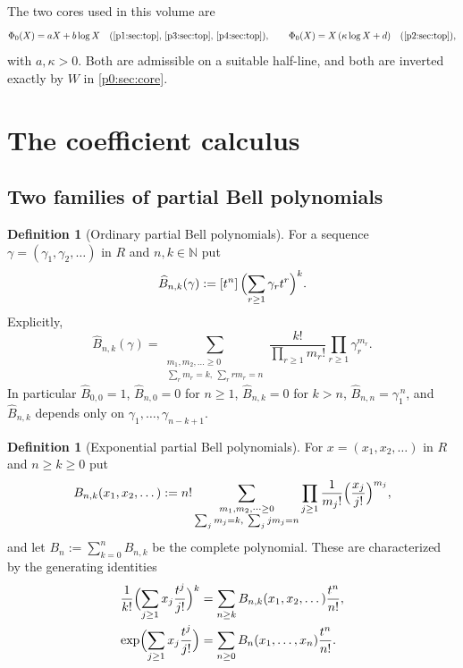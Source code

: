 \documentclass[11pt,a4paper,oneside]{book}
\theoremstyle{plain}
\theoremstyle{definition}
\newtheorem{definition}[theorem]{Definition}
\theoremstyle{remark}
\newcommand{\Nat}{\mathbb{N}}
\newcommand{\Coef}[1]{[#1]\,}
\newcommand{\OB}{\widehat{B}}
\newcommand{\EB}{B}
\newcommand{\Wlam}{W}
\begin{document}
The two cores used in this volume are
\begin{equation}\label{p0:eq:two-cores}
 \Phi_0(X)=aX+b\log X
 \quad(\text{\cref{p1:sec:top},\ \ref{p3:sec:top},\ \ref{p4:sec:top}}),
 \qquad
 \Phi_0(X)=X\,(\kappa\log X+d)
 \quad(\text{\cref{p2:sec:top}}),
\end{equation}
with $a,\kappa>0$.  Both are admissible on a suitable half-line, and both are
inverted exactly by $\Wlam$ in \cref{p0:sec:core}.

\section{The coefficient calculus}\label{p0:sec:calculus}

\subsection{Two families of partial Bell polynomials}

\begin{definition}[Ordinary partial Bell polynomials]\label{p0:def:obell}
For a sequence $\gamma=(\gamma_1,\gamma_2,\dots)$ in $R$ and $n,k\in\Nat$ put
\begin{equation}\label{p0:eq:obell-def}
 \OB_{n,k}(\gamma):=\Coef{t^n}\Bigl(\sum_{r\ge1}\gamma_rt^r\Bigr)^{k}.
\end{equation}
Explicitly,
\begin{equation}\label{p0:eq:obell-multinomial}
 \OB_{n,k}(\gamma)
 =\sum_{\substack{m_1,m_2,\dots\ge0\\ \sum_rm_r=k,\ \sum_rrm_r=n}}
   \frac{k!}{\prod_{r\ge1}m_r!}\prod_{r\ge1}\gamma_r^{m_r}.
\end{equation}
In particular $\OB_{0,0}=1$, $\OB_{n,0}=0$ for $n\ge1$, $\OB_{n,k}=0$ for
$k>n$, $\OB_{n,n}=\gamma_1^{\,n}$, and $\OB_{n,k}$ depends only on
$\gamma_1,\dots,\gamma_{n-k+1}$.
\end{definition}

\begin{definition}[Exponential partial Bell polynomials]\label{p0:def:ebell}
For $x=(x_1,x_2,\dots)$ in $R$ and $n\ge k\ge0$ put
\begin{equation}\label{p0:eq:ebell-def}
 \EB_{n,k}(x_1,x_2,\dots)
 :=n!\sum_{\substack{m_1,m_2,\dots\ge0\\ \sum_jm_j=k,\ \sum_jjm_j=n}}
   \prod_{j\ge1}\frac1{m_j!}\Bigl(\frac{x_j}{j!}\Bigr)^{m_j},
\end{equation}
and let $\EB_n:=\sum_{k=0}^{n}\EB_{n,k}$ be the complete polynomial.  These are
characterized by the generating identities
\begin{align}
 \frac1{k!}\Bigl(\sum_{j\ge1}x_j\frac{t^j}{j!}\Bigr)^{k}
 &=\sum_{n\ge k}\EB_{n,k}(x_1,x_2,\dots)\frac{t^n}{n!},
 \label{p0:eq:ebell-egf-partial}\\
 \exp\Bigl(\sum_{j\ge1}x_j\frac{t^j}{j!}\Bigr)
 &=\sum_{n\ge0}\EB_n(x_1,\dots,x_n)\frac{t^n}{n!}.
 \label{p0:eq:ebell-egf-complete}
\end{align}
\end{definition}
\end{document}
